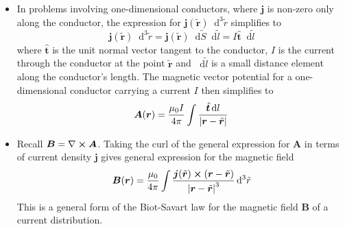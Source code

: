 \documentclass[11pt, a4paper]{article}
\newcommand{\diff}{\mathop{}\!\mathrm{d}} %
\renewcommand{\vec}[1]{\bm{#1}} %
\newcommand{\uvec}[1]{\hat{\vec{#1}}} %
\newcommand{\tvec}[1]{\tilde{\vec{#1}}} %
\renewcommand{\r}{\vec{r}}
\newcommand{\B}{\vec{B}} %
\newcommand{\A}{\vec{A}} %
\renewcommand{\curl}{\nabla \cross}
\begin{document}
\begin{itemize}
	\item In problems involving one-dimensional conductors, where $ \vec{j} $ is non-zero only along the conductor, the expression for $ \vec{j}(\tvec{r})\diff^{3}\tilde{r} $ simplifies to
	\begin{equation*}
		\vec{j}(\tvec{r})\diff^{3}\tilde{r} = \vec{j}(\tvec{r}) \diff \tilde{S} \diff \tilde{l} = I \uvec{t} \diff \tilde{l}
	\end{equation*}
	where $ \uvec{t} $ is the unit normal vector tangent to the conductor, $ I $ is the current through the conductor at the point $ \tvec{r} $ and $ \diff \tilde{l} $ is a small distance element along the conductor's length. The magnetic vector potential for a one-dimensional conductor carrying a current $ I $ then simplifies to
	\begin{equation*}
		\A(\r) = \frac{\mu_{0}I}{4\pi} \int \frac{\uvec{t} \diff l}{\abs{\r - \tvec{r}}}
	\end{equation*}
	
	\item Recall $ \B = \curl \A $. Taking the curl of the general expression for $ \A $ in terms of current density $ \vec{j} $ gives general expression for the magnetic field 
	\begin{equation*}
		\B (\r) = \frac{\mu_{0}}{4\pi}\int \frac{\vec{j}(\tvec{r}) \cross (\r - \tvec{r})}{\abs{\r - \tvec{r}}^{3}} \diff^{3}\tilde{r}
	\end{equation*}
	This is a general form of the Biot-Savart law for the magnetic field $ \B $ of a current distribution.
	
\end{itemize}
\end{document}
